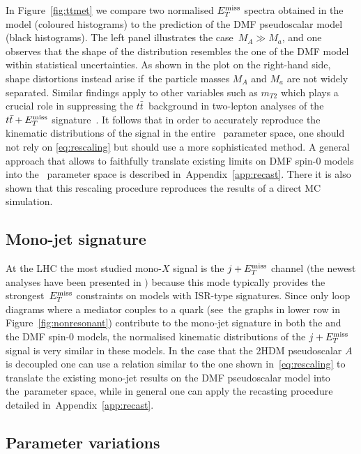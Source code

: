 {\color{red} In Figure~\ref{fig:ttmet} we compare two normalised $E_T^\mathrm{miss}$ spectra obtained in the \hdma model (coloured histograms) to the prediction of the DMF pseudoscalar   model (black histograms).  The left panel illustrates the case~$M_A \gg M_a$, and one observes that the shape of the \hdma distribution resembles  the one of the DMF model within statistical uncertainties. As shown in the plot on the right-hand side, shape distortions instead arise if~the particle masses $M_A$ and $M_a$ are not widely separated.  Similar findings apply to other variables such as $m_{T2}$ which  plays a crucial role in suppressing the $t \bar t$~background in two-lepton analyses of the $t \bar t + E_T^\mathrm{miss}$ signature~\cite{Aaboud:2017rzf,Haisch:2016gry}. It follows that in order to accurately reproduce the kinematic distributions of the signal in the entire \hdma~parameter space, one should not rely on \eqref{eq:rescaling} but should use a more sophisticated method. A general approach  that allows to faithfully translate existing limits on DMF spin-0   models into the \hdma~parameter space  is described in~Appendix~\ref{app:recast}. There it is also shown that this rescaling procedure reproduces the results of a direct MC simulation. 
}

\subsection*{Mono-jet signature}

At the LHC the most studied mono-$X$ signal is the $j +E_T^\mathrm{miss}$ channel $\big($the newest analyses have been presented in \cite{Aaboud:2017phn,Sirunyan:2017jix}$\big)$ because this mode typically provides the strongest~$E_T^\mathrm{miss}$ constraints on models with ISR-type signatures. Since only loop diagrams where a mediator couples to a quark (see~the graphs in lower row in Figure~\ref{fig:nonresonant}) contribute to the mono-jet signature in both the \hdma and the DMF spin-0 models, the normalised kinematic distributions of the $j +E_T^\mathrm{miss}$ signal is very similar in these models. In the case that the 2HDM pseudoscalar $A$ is decoupled one can use a relation similar to the one shown in~\eqref{eq:rescaling} to translate the existing mono-jet results on the DMF pseudoscalar model into the~\hdma parameter space, while in general one can apply the recasting procedure detailed in~Appendix~\ref{app:recast}.

\subsection{Parameter variations}

